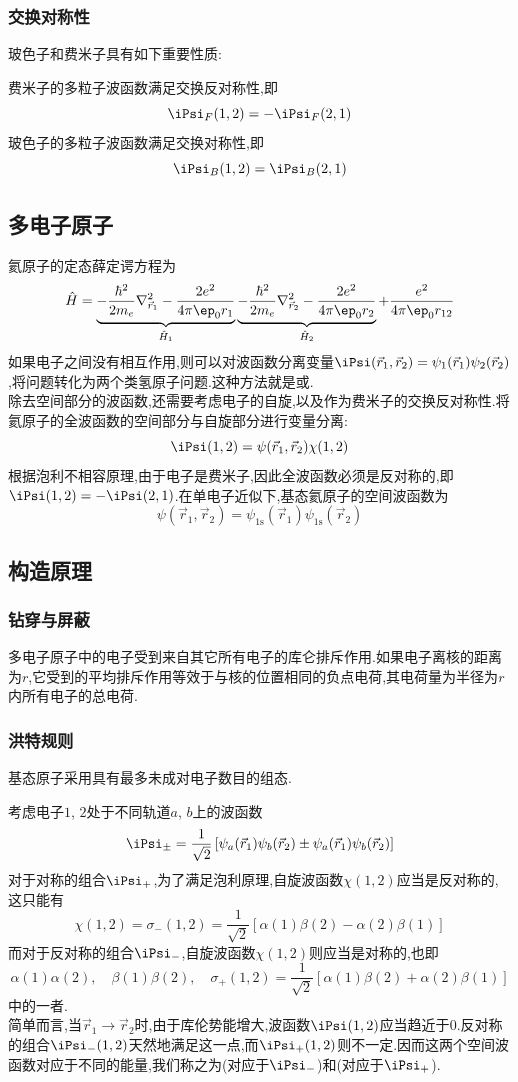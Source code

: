 \documentclass{ctexbook}
\begin{document}
\subsubsection{交换对称性}
玻色子和费米子具有如下重要性质:
\begin{theorem}
	费米子的多粒子波函数满足交换反对称性,即
	\[\iPsi_F(1,2)=-\iPsi_F(2,1)\]
	玻色子的多粒子波函数满足交换对称性,即
	\[\iPsi_B(1,2)=\iPsi_B(2,1)\]
\end{theorem}
\subsection{多电子原子}
氦原子的定态薛定谔方程为
\[\hat{H}=\underbrace{-\dfrac{\hbar^2}{2m_e}\nabla_{\vec{r}_1}^2-\dfrac{2e^2}{4\pi\ep_0 r_1}}_{\hat{H}_1}\underbrace{-\dfrac{\hbar^2}{2m_e}\nabla_{\vec{r}_2}^2-\dfrac{2e^2}{4\pi\ep_0 r_2}}_{\hat{H}_2}+\dfrac{e^2}{4\pi\ep_0r_{12}}\]
如果电子之间没有相互作用,则可以对波函数分离变量$\iPsi(\vec{r}_1,\vec{r}_2)=\psi_1(\vec{r}_1)\psi_2(\vec{r}_2)$,将问题转化为两个类氢原子问题.这种方法就是或.\\
\indent 除去空间部分的波函数,还需要考虑电子的自旋,以及作为费米子的交换反对称性.将氦原子的全波函数的空间部分与自旋部分进行变量分离:
\[\iPsi(1,2)=\psi(\vec{r}_1,\vec{r}_2)\chi(1,2)\]
根据泡利不相容原理,由于电子是费米子,因此全波函数必须是反对称的,即$\iPsi(1,2)=-\iPsi(2,1)$.在单电子近似下,基态氦原子的空间波函数为
\[\psi(\vec{r}_1,\vec{r}_2)=\psi_{1\text{s}}(\vec{r}_1)\psi_{1\text{s}}(\vec{r}_2)\]
\subsection{构造原理}
\subsubsection{钻穿与屏蔽}
多电子原子中的电子受到来自其它所有电子的库仑排斥作用.如果电子离核的距离为$r$,它受到的平均排斥作用等效于与核的位置相同的负点电荷,其电荷量为半径为$r$内所有电子的总电荷.
\subsubsection{洪特规则}
\begin{theorem}[洪特规则]
	基态原子采用具有最多未成对电子数目的组态.
\end{theorem}
考虑电子$1$, $2$处于不同轨道$a$, $b$上的波函数
\[\iPsi_{\pm}=\dfrac{1}{\sqrt2}\left[\psi_a(\vec{r}_1)\psi_b(\vec{r}_2)\pm\psi_a(\vec{r}_1)\psi_b(\vec{r}_2)\right]\]
对于对称的组合$\iPsi_+$,为了满足泡利原理,自旋波函数$\chi(1,2)$应当是反对称的,这只能有
\[\chi(1,2)=\sigma_-(1,2)=\dfrac{1}{\sqrt{2}}\left[\alpha(1)\beta(2)-\alpha(2)\beta(1)\right]\]
而对于反对称的组合$\iPsi_-$,自旋波函数$\chi(1,2)$则应当是对称的,也即
\[\alpha(1)\alpha(2),\quad\beta(1)\beta(2),\quad\sigma_+(1,2)=\dfrac{1}{\sqrt{2}}\left[\alpha(1)\beta(2)+\alpha(2)\beta(1)\right]\]
中的一者.\\
\indent 简单而言,当$\vec{r}_1\to\vec{r}_2$时,由于库伦势能增大,波函数$\iPsi(1,2)$应当趋近于$0$.反对称的组合$\iPsi_-(1,2)$天然地满足这一点,而$\iPsi_+(1,2)$则不一定.因而这两个空间波函数对应于不同的能量,我们称之为(对应于$\iPsi_-$)和(对应于$\iPsi_+$).
\end{document}
